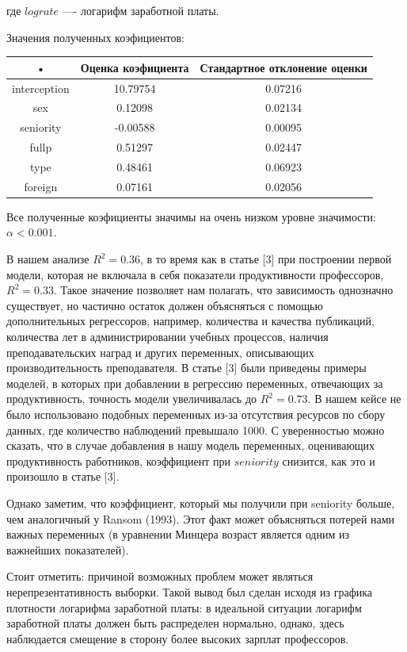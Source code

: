\documentclass[a4paper, 12pt]{article}
\theoremstyle{definition}
\theoremstyle{plain}
\begin{document}
где $lograte$ —- логарифм заработной платы.

Значения полученных коэфициентов:

\begin{center}
\begin{tabular}{|c|c|c|}
\hline
• & Оценка коэфициента & Стандартное отклонение оценки \\
\hline
interception & 10.79754 & 0.07216 \\
\hline
sex & 0.12098 & 0.02134 \\
\hline
seniority & -0.00588 & 0.00095 \\
\hline
fullp & 0.51297 & 0.02447 \\
\hline
type & 0.48461 & 0.06923 \\
\hline
foreign & 0.07161 & 0.02056 \\
\hline
\end{tabular}
\end{center}

Все полученные коэфициенты значимы на очень низком уровне значимости: $\alpha<0.001$.

В нашем анализе $R^2=0.36$, в то время как в статье [3] при построении первой модели, которая не включала в себя показатели продуктивности профессоров, $R^2=0.33$. Такое значение позволяет нам полагать, что зависимость однозначно существует, но частично остаток должен объясняться с помощью дополнительных регрессоров, например, количества и качества публикаций, количества лет в администрировании учебных процессов, наличия преподавательских наград и других переменных, описывающих производительность преподавателя. В статье [3] были приведены примеры моделей, в которых при добавлении в регрессию переменных, отвечающих за продуктивность, точность модели увеличивалась до $R^2=0.73$. В нашем кейсе не было использовано подобных переменных из-за отсутствия ресурсов по сбору данных, где количество наблюдений превышало 1000. С уверенностью можно сказать, что в случае добавления в нашу модель переменных, оценивающих продуктивность работников, коэффициент при $seniority$ снизится, как это и произошло в статье [3].

Однако заметим, что коэффициент, который мы получили при seniority больше, чем аналогичный у Ransom (1993). Этот факт может объясняться потерей нами важных переменных (в уравнении Минцера возраст является одним из важнейших показателей).

Стоит отметить: причиной возможных проблем может являться нерепрезентативность выборки. Такой вывод был сделан исходя из графика плотности логарифма заработной платы: в идеальной ситуации логарифм заработной платы должен быть распределен нормально, однако, здесь наблюдается смещение в сторону более высоких зарплат профессоров.
\end{document}
